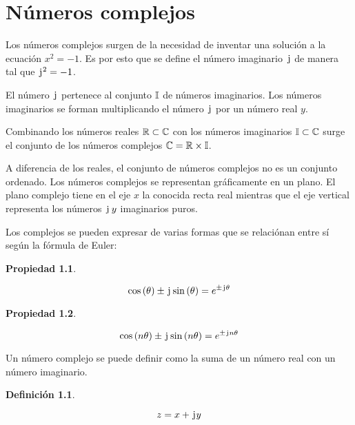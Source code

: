 \documentclass[a5paper,12pt,twoside]{book}
\newtheorem{defn}{{Definición}}[chapter]
\newtheorem{prop}{{Propiedad}}[chapter]
\begin{document}
\chapter{Números complejos}


Los números complejos surgen de la necesidad de inventar una solución a la ecuación $x^2=-1$.
Es por esto que se define el número imaginario $\mkern2mu\mathrm{j}\mkern1mu$ de manera tal que $\mkern2mu\mathrm{j}\mkern1mu^2=-1$.

El número $\mkern2mu\mathrm{j}\mkern1mu$ pertenece al conjunto $\mathbb{I}$ de números imaginarios.
Los números imaginarios se forman multiplicando el número $\mkern2mu\mathrm{j}\mkern1mu$ por un número real $y$.

Combinando los números reales $\mathbb{R} \subset \mathbb{C}$ con los números imaginarios $\mathbb{I} \subset \mathbb{C}$ surge el conjunto de los números complejos $\mathbb{C}=\mathbb{R} \times \mathbb{I}$.

A diferencia de los reales, el conjunto de números complejos no es un conjunto ordenado.
Los números complejos se representan gráficamente en un plano.
El plano complejo tiene en el eje $x$ la conocida recta real mientras que el eje vertical representa los números $\mkern2mu\mathrm{j}\mkern1mu \, y$ imaginarios puros.

Los complejos se pueden expresar de varias formas que se relaciónan entre sí según la fórmula de Euler:

\begin{mdframed}[style=PropertyFrame]
    \begin{prop}
        \label{prop:EulerFormula}
    \end{prop}
    \begin{equation*}
        \cos{(\theta)} \pm \mkern2mu\mathrm{j}\mkern1mu \sin{(\theta)} = e^{\pm \mkern2mu\mathrm{j}\mkern1mu \theta}
    \end{equation*}
\end{mdframed}

\begin{mdframed}[style=PropertyFrame]
    \begin{prop}
    \end{prop}
    \begin{equation*}
        \cos{(n \theta)} \pm \mkern2mu\mathrm{j}\mkern1mu \sin{(n \theta)} = e^{\pm \mkern2mu\mathrm{j}\mkern1mu n \theta}
    \end{equation*}
\end{mdframed}

Un número complejo se puede definir como la suma de un número real con un número imaginario.

\begin{mdframed}[style=DefinitionFrame]
    \begin{defn}
        \label{defn:BinomialForm}
    \end{defn}
    \begin{equation*}
        z = x + \mkern2mu\mathrm{j}\mkern1mu y
    \end{equation*}
\end{mdframed}
\end{document}
